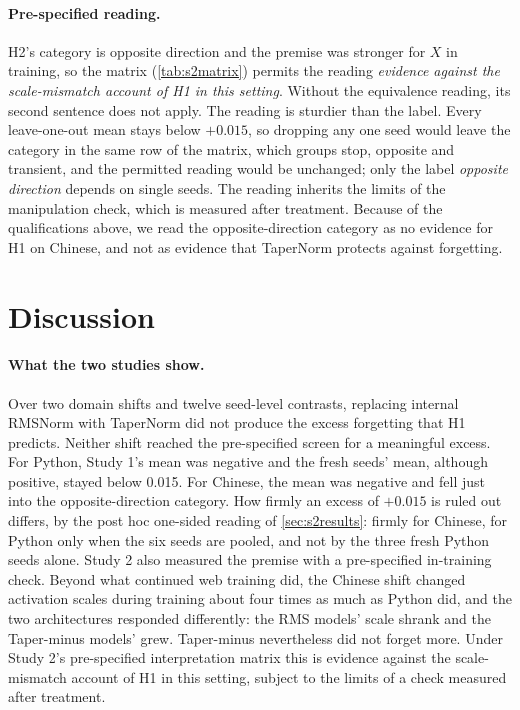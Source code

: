 \documentclass[11pt]{article}
\begin{document}
\paragraph{Pre-specified reading.} H2's category is opposite direction and the premise was stronger for $X$ in
training, so the matrix (\cref{tab:s2matrix}) permits the reading \emph{evidence against the scale-mismatch account
of H1 in this setting}. Without the equivalence reading, its second sentence does not apply. The reading is
sturdier than the label. Every leave-one-out mean stays below $+0.015$, so dropping any one seed would leave the
category in the same row of the matrix, which groups stop, opposite and transient, and the permitted reading
would be unchanged; only the label \emph{opposite direction} depends on single seeds. The reading inherits the
limits of the manipulation check, which is measured after treatment. Because of the qualifications above, we read
the opposite-direction category as no evidence for H1 on Chinese, and not as evidence that TaperNorm protects
against forgetting.

\section{Discussion}
\label{sec:discussion}

\paragraph{What the two studies show.} Over two domain shifts and twelve seed-level contrasts, replacing internal
RMSNorm with TaperNorm did not produce the excess forgetting that H1 predicts. Neither shift reached the
pre-specified screen for a meaningful excess. For Python, Study 1's mean was negative and the fresh seeds' mean,
although positive, stayed below 0.015. For Chinese, the mean was negative and fell just into the opposite-direction
category. How firmly an excess of $+0.015$ is ruled out differs, by the post hoc one-sided reading of
\cref{sec:s2results}: firmly for Chinese, for Python only when the six seeds are pooled, and not by the three fresh
Python seeds alone. Study 2 also measured the premise with a pre-specified in-training check. Beyond what
continued web training did, the Chinese shift changed activation scales during training about four times as much
as Python did, and the two architectures responded differently: the RMS models' scale shrank and the Taper-minus
models' grew. Taper-minus nevertheless did not forget more. Under Study 2's pre-specified interpretation matrix
this is evidence against the scale-mismatch account of H1 in this setting, subject to the limits of a check
measured after treatment.
\end{document}
